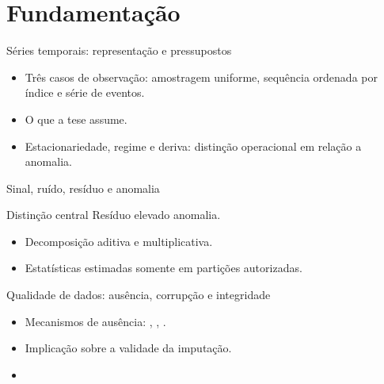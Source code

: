 
\section{Fundamentação}

\begin{frame}{Séries temporais: representação e pressupostos}
  \begin{itemize}
    \item Três casos de observação: amostragem uniforme, sequência ordenada
          por índice e série de eventos.
    \item O que a tese  assume.
    \item Estacionariedade, regime e deriva: distinção operacional em
          relação a anomalia.
  \end{itemize}
\end{frame}

\begin{frame}{Sinal, ruído, resíduo e anomalia}
  \begin{block}{Distinção central}
    Resíduo elevado  anomalia.
  \end{block}
  \vspace{0.4em}
  \begin{itemize}
    \item Decomposição aditiva e multiplicativa.
    \item Estatísticas estimadas somente em partições autorizadas.
  \end{itemize}
\end{frame}

\begin{frame}{Qualidade de dados: ausência, corrupção e integridade}
  \begin{itemize}
    \item Mecanismos de ausência: , , .
    \item Implicação sobre a validade da imputação.
    \item {}
  \end{itemize}
\end{frame}

